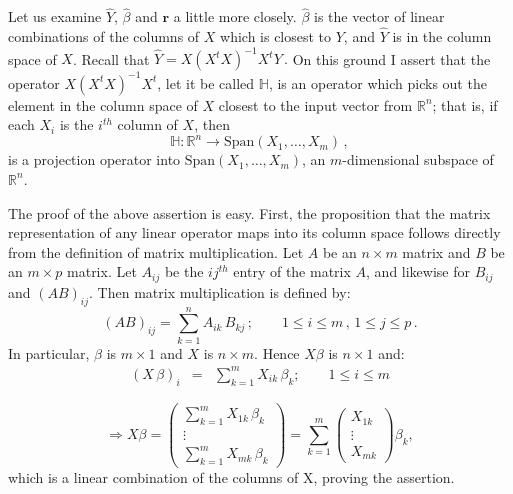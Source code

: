 Let us examine $\hat{Y}$, $\hat{\beta}$ and $\mathbf{r}$ a little more closely. $\hat{\beta}$ is the vector of linear combinations of the columns of $X$ which is closest to $Y$, and $\hat{Y}$ is in the column space of $X$. Recall that $ \hat{Y} =  X (X^t X)^{-1} X^t Y \,.$  On this ground I assert that the operator $ X (X^t X)^{-1} X^t$, let it be called $\mathbb{H}$, is an operator which picks out the element in the column space of $X$ closest to the input vector from $\mathbb{R}^n$; that is, if each $X_i$ is the $i^{th}$ column of $X$, then \[\mathbb{H}:\mathbb{R}^n \longrightarrow \mbox{Span}(X_1, \dots, X_m)\,,\]  is a projection operator into $\mbox{Span}(X_1, \dots, X_m) $, an $m$-dimensional subspace of $\mathbb{R}^n$. 

The proof of the above assertion is easy. First, the proposition that the matrix representation of any linear operator maps into its column space follows directly from the definition of matrix multiplication. Let $A$ be an $n \times m$ matrix and $B$ be an $m \times p$ matrix. Let  $A_{ij}$ be the $ij^{th}$ entry of the matrix $A$, and likewise for $B_{ij}$ and $(AB)_{ij}$. Then matrix multiplication is defined by:
 \[ (AB)_{ij} = \displaystyle\sum_{k=1}^n A_{ik} \, B_{kj} \, ; \qquad 1 \leq i \leq m \,,\, 1\leq j \leq p \,.\]
In particular, $\beta$ is $m \times 1$ and $X$ is $n \times m$. Hence $X\beta$ is $n \times 1$ and: \begin{eqnarray} (X \, \beta)_{i} &=& \displaystyle\sum_{k=1}^m X_{ik} \, \beta_{k}  ; \qquad 1 \leq i \leq m  \end{eqnarray}

\begin{equation}  \Rightarrow X \beta = \left( \begin{array}{c} \displaystyle\sum_{k=1}^m X_{1k} \, \beta_{k} \\ \vdots \\ \displaystyle\sum_{k=1}^m X_{mk} \, \beta_{k}  \end{array}\right) =  \displaystyle\sum_{k=1}^m \left( \begin{array}{c} X_{1k} \,  \\ \vdots \\  X_{mk} \end{array}\right) \beta_{k}, \end{equation}
which is a linear combination of the columns of X, proving the assertion.


